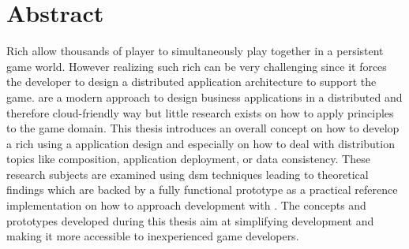 \section*{Abstract}

Rich \ogs{} allow thousands of player to simultaneously play together in a
persistent game world. However realizing such rich \ogs{} can be very
challenging since it forces the developer to design a distributed application
architecture to support the game. \mss{} are a modern approach to design
business applications in a distributed and therefore cloud-friendly way but
little research exists on how to apply \ms{} principles to the game domain. This
thesis introduces an overall concept on how to develop a rich \og{} using a
\ms{} application design and especially on how to deal with distribution topics
like \ms{} composition, application deployment, or data consistency. These
research subjects are examined using \gls{dsm} techniques leading to theoretical
findings which are backed by a fully functional prototype as a practical
reference implementation on how to approach \og{} development with \mss{}. The
concepts and prototypes developed during this thesis aim at simplifying \og{}
development and making it more accessible to inexperienced game developers.
